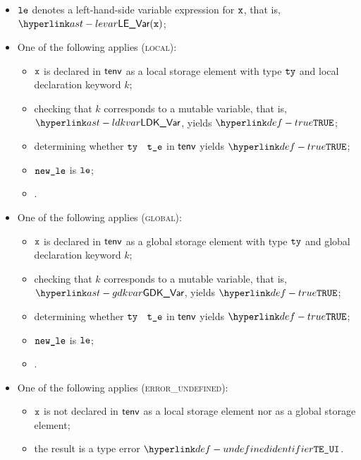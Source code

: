 \begin{itemize}
  \item $\vle$ denotes a left-hand-side variable expression for $\vx$, that is, $\LEVar(\vx)$;
  \item One of the following applies (\textsc{local}):
  \begin{itemize}
    \item $\vx$ is declared in $\tenv$ as a local storage element with type $\tty$ and local declaration keyword $k$;
    \item checking that $k$ corresponds to a mutable variable, that is, $\LDKVar$, yields $\True$\ProseTerminateAs{\AssignmentToImmutable};
    \item determining whether $\tty$ \typesatisfies\ $\vte$ in $\tenv$ yields $\True$\ProseOrTypeError;
    \item $\newle$ is $\vle$;
    \item {}.
  \end{itemize}

  \item One of the following applies (\textsc{global}):
  \begin{itemize}
    \item $\vx$ is declared in $\tenv$ as a global storage element with type $\tty$ and global declaration keyword $k$;
    \item checking that $k$ corresponds to a mutable variable, that is, $\GDKVar$, yields $\True$\ProseTerminateAs{\AssignmentToImmutable};
    \item determining whether $\tty$ \typesatisfies\ $\vte$ in $\tenv$ yields $\True$\ProseOrTypeError;
    \item $\newle$ is $\vle$;
    \item {}.
  \end{itemize}

  \item One of the following applies (\textsc{error\_undefined}):
  \begin{itemize}
    \item $\vx$ is not declared in $\tenv$ as a local storage element nor as a global storage element;
    \item the result is a type error $\UndefinedIdentifier$.
  \end{itemize}
\end{itemize}
\FormallyParagraph
\begin{mathpar}
\end{mathpar}


